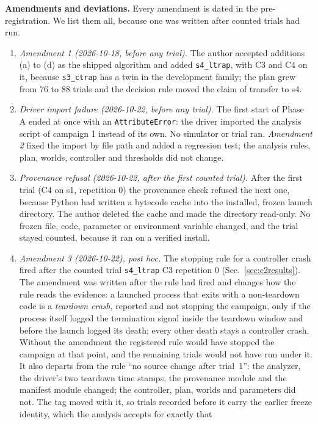 \documentclass[journal]{IEEEtran}
\begin{document}
\textbf{Amendments and deviations.} Every amendment is dated in the pre-registration. We list them
all, because one was written after counted trials had run.
\begin{enumerate}
\item \emph{Amendment 1 (2026-10-18, before any trial).} The author accepted additions (a) to (d)
  as the shipped algorithm and added \texttt{s4\_ltrap}, with C3 and C4 on it, because \texttt{s3\_ctrap}
  has a twin in the development family; the plan grew from 76 to 88 trials and the decision rule moved
  the claim of transfer to s4.
\item \emph{Driver import failure (2026-10-22, before any trial).} The first start of Phase A ended at once
  with an \texttt{AttributeError}: the driver imported the analysis script of campaign 1 instead of
  its own. No simulator or trial ran. \emph{Amendment 2} fixed the import by file path and added a
  regression test; the analysis rules, plan, worlds, controller and thresholds did not change.
\item \emph{Provenance refusal (2026-10-22, after the first counted trial).} After the first trial
  (C4 on s1, repetition 0) the provenance check refused the next one, because Python had written a
  bytecode cache into the installed, frozen launch directory. The author deleted the cache and made the
  directory read-only. No frozen file, code, parameter or environment variable changed, and the trial
  stayed counted, because it ran on a verified install.
\item \emph{Amendment 3 (2026-10-22), post hoc.} The stopping rule for a controller crash fired after the
  counted trial \texttt{s4\_ltrap} C3 repetition 0 (Sec.~\ref{sec:c2results}). The amendment
  was written after the rule had fired and changes how the rule reads the evidence: a launched process
  that exits with a non-teardown code is a \emph{teardown crash}, reported and not stopping the
  campaign, only if the process itself logged the termination signal inside the teardown window and
  before the launch logged its death; every other death stays a controller crash. Without the
  amendment the registered rule would have stopped the campaign at that point, and the remaining trials
  would not have run under it. It also departs from the rule ``no source change after trial~1'':
  the analyzer, the driver's two teardown time stamps, the provenance module and the manifest module
  changed; the controller, plan, worlds and parameters did not. The tag moved with it, so trials
  recorded before it carry the earlier freeze identity, which the analysis accepts for exactly that

\end{enumerate}
\end{document}
